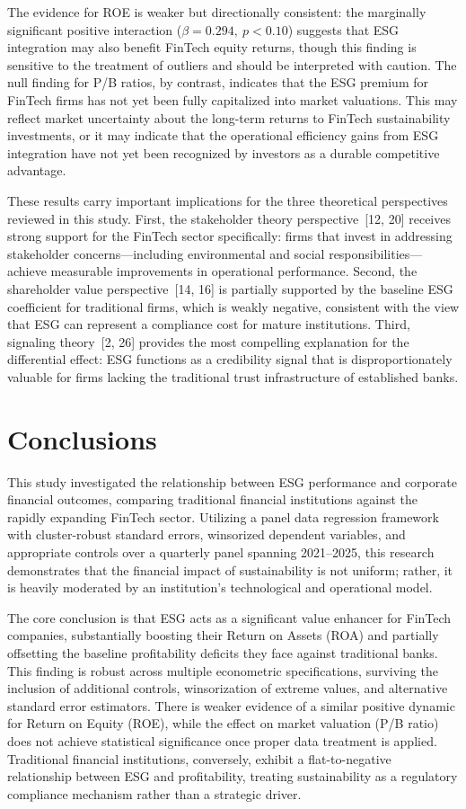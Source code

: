 \documentclass[12pt]{article}
\begin{document}
The evidence for ROE is weaker but directionally consistent: the marginally significant positive interaction ($\beta = 0.294,\ p < 0.10$) suggests that ESG integration may also benefit FinTech equity returns, though this finding is sensitive to the treatment of outliers and should be interpreted with caution. The null finding for P/B ratios, by contrast, indicates that the ESG premium for FinTech firms has not yet been fully capitalized into market valuations. This may reflect market uncertainty about the long-term returns to FinTech sustainability investments, or it may indicate that the operational efficiency gains from ESG integration have not yet been recognized by investors as a durable competitive advantage.

These results carry important implications for the three theoretical perspectives reviewed in this study. First, the stakeholder theory perspective~[12, 20] receives strong support for the FinTech sector specifically: firms that invest in addressing stakeholder concerns---including environmental and social responsibilities---achieve measurable improvements in operational performance. Second, the shareholder value perspective~[14, 16] is partially supported by the baseline ESG coefficient for traditional firms, which is weakly negative, consistent with the view that ESG can represent a compliance cost for mature institutions. Third, signaling theory~[2, 26] provides the most compelling explanation for the differential effect: ESG functions as a credibility signal that is disproportionately valuable for firms lacking the traditional trust infrastructure of established banks.

\section{Conclusions}\label{sec:conclusion}
This study investigated the relationship between ESG performance and corporate financial outcomes, comparing traditional financial institutions against the rapidly expanding FinTech sector. Utilizing a panel data regression framework with cluster-robust standard errors, winsorized dependent variables, and appropriate controls over a quarterly panel spanning 2021--2025, this research demonstrates that the financial impact of sustainability is not uniform; rather, it is heavily moderated by an institution's technological and operational model.

The core conclusion is that ESG acts as a significant value enhancer for FinTech companies, substantially boosting their Return on Assets (ROA) and partially offsetting the baseline profitability deficits they face against traditional banks. This finding is robust across multiple econometric specifications, surviving the inclusion of additional controls, winsorization of extreme values, and alternative standard error estimators. There is weaker evidence of a similar positive dynamic for Return on Equity (ROE), while the effect on market valuation (P/B ratio) does not achieve statistical significance once proper data treatment is applied. Traditional financial institutions, conversely, exhibit a flat-to-negative relationship between ESG and profitability, treating sustainability as a regulatory compliance mechanism rather than a strategic driver.
\end{document}
